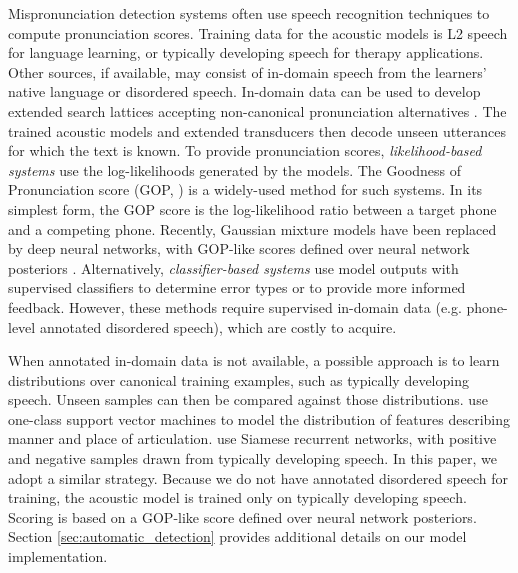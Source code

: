 Mispronunciation detection systems often use speech recognition techniques to compute pronunciation scores.
Training data for the acoustic models is L2 speech for language learning, or typically developing speech for therapy applications.
Other sources, if available, may consist of in-domain speech from the learners' native language or disordered speech.
In-domain data can be used to develop extended search lattices accepting non-canonical pronunciation alternatives \citep{harrison2009implementation, ward2016automated, dudy2018automatic}.
The trained acoustic models and extended transducers then decode unseen utterances for which the text is known.
To provide pronunciation scores, \emph{likelihood-based systems} use the log-likelihoods generated by the models.
The Goodness of Pronunciation score (GOP, \cite{witt2000phone}) is a widely-used method for such systems.
In its simplest form, the GOP score is the log-likelihood ratio between a target phone and a competing phone.
Recently, Gaussian mixture models have been replaced by deep neural networks, with GOP-like scores defined over neural network posteriors \citep{hu2015improved}.
Alternatively, \emph{classifier-based systems} use model outputs with supervised classifiers to determine error types or to provide more informed feedback.
However, these methods require supervised in-domain data (e.g. phone-level annotated disordered speech), which are costly to acquire.

When annotated in-domain data is not available, a possible approach is to learn distributions over canonical training examples, such as  typically developing speech.
Unseen samples can then be compared against those distributions.
\cite{shahin2018anomaly} use one-class support vector machines to model the distribution of features describing manner and place of articulation.
\cite{wang2019child} use Siamese recurrent networks, with positive and negative samples drawn from typically developing speech.
In this paper, we adopt a similar strategy.
Because we do not have annotated disordered speech for training, the acoustic model is trained only on typically developing speech.
Scoring is based on a GOP-like score defined over neural network posteriors.
Section \ref{sec:automatic_detection} provides additional details on our model implementation.

